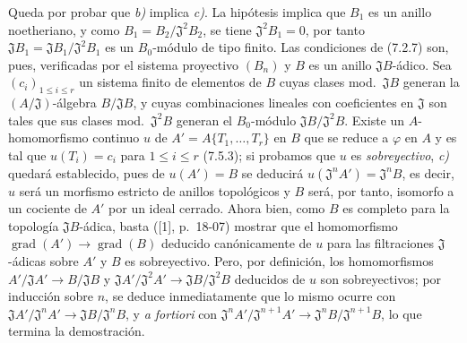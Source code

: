 Queda por probar que \emph{b)} implica \emph{c)}. La hipótesis implica que $B_1$ es un
anillo noetheriano, y como $B_1=B_2/\mathfrak J^2B_2$, se tiene
$\mathfrak J^2B_1=0$, por tanto
$\mathfrak JB_1=\mathfrak JB_1/\mathfrak J^2B_1$ es un $B_0$-módulo de tipo
finito. Las condiciones de (7.2.7) son, pues, verificadas por el sistema proyectivo
$(B_n)$ y $B$ es un anillo $\mathfrak JB$-ádico. Sea
$(c_i)_{1\leq i\leq r}$ un sistema finito de elementos de $B$ cuyas clases
mod.~$\mathfrak JB$ generan la $(A/\mathfrak J)$-álgebra
$B/\mathfrak JB$, y cuyas combinaciones lineales con coeficientes en
$\mathfrak J$ son tales que sus clases mod.~$\mathfrak J^2B$ generan
el $B_0$-módulo $\mathfrak JB/\mathfrak J^2B$. Existe un
$A$-homomorfismo continuo $u$ de $A'=A\{T_1,\ldots,T_r\}$ en $B$ que se
reduce a $\varphi$ en $A$ y es tal que $u(T_i)=c_i$ para $1\leq i\leq r$
(7.5.3); si probamos que $u$ es \emph{sobreyectivo}, \emph{c)} quedará establecido, pues de
$u(A')=B$ se deducirá $u(\mathfrak J^nA')=\mathfrak J^nB$, es decir, $u$
será un morfismo estricto de anillos topológicos y $B$ será, por tanto, isomorfo a un
cociente de $A'$ por un ideal cerrado. Ahora bien, como $B$ es completo para la topología
$\mathfrak JB$-ádica, basta ([1], p.~18-07) mostrar que
el homomorfismo $\operatorname{grad}(A')\to\operatorname{grad}(B)$ deducido
canónicamente de $u$ para las filtraciones $\mathfrak J$-ádicas sobre $A'$ y
$B$ es sobreyectivo. Pero, por definición, los homomorfismos
$A'/\mathfrak JA'\to B/\mathfrak JB$ y
$\mathfrak JA'/\mathfrak J^2A'\to\mathfrak JB/\mathfrak J^2B$ deducidos de $u$
son sobreyectivos; por inducción sobre $n$, se deduce inmediatamente que lo mismo
ocurre con $\mathfrak JA'/\mathfrak J^nA'\to\mathfrak JB/\mathfrak J^nB$, y
\emph{a fortiori} con
$\mathfrak J^nA'/\mathfrak J^{n+1}A'\to
\mathfrak J^nB/\mathfrak J^{n+1}B$, lo que termina la demostración.

